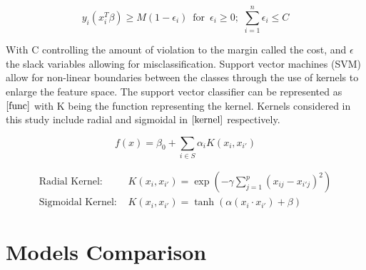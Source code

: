 \documentclass[12pt]{report}
\begin{document}
\begin{equation}
    y_{i}(x^{T}_{i}\beta) \ge M(1-\epsilon_{i}) \phantom{0} \text{for} \phantom{0}  
    \epsilon_{i} \ge 0; \phantom{i} \sum^{n}_{i=1} \epsilon_{i} \le C
\end{equation}

With C controlling the amount of violation to the margin called the cost, and $\epsilon$ the slack variables allowing for misclassification. Support vector machines (SVM) allow for non-linear boundaries between the classes through the use of kernels to enlarge the feature space. The support vector classifier can be represented as $\eqref{func}$ with K being the function representing the kernel. Kernels considered in this study include radial and sigmoidal in $\eqref{kernel}$ respectively.

\begin{equation} \label{func}
    f(x) = \beta_{0} + \sum_{i \in \textit{S}} \alpha_{i} K(x_{i}, x_{i'}) 
\end{equation}

\begin{equation} \label{kernel}
    \begin{split}
    \text{Radial Kernel: }& K(x_{i}, x_{i'}) = \exp(-\gamma \sum^{p}_{j=1} (x_{ij} - x_{i'j})^{2})
    \\
    \text{Sigmoidal Kernel: }& K(x_{i}, x_{i'}) = \tanh(\alpha(x_{i} \cdot x_{i'}) + \beta)
    \end{split}
\end{equation}

\begingroup
\renewcommand{\cleardoublepage}{}
\renewcommand{\clearpage}{}

\chapter{Models Comparison}
\endgroup
\end{document}
